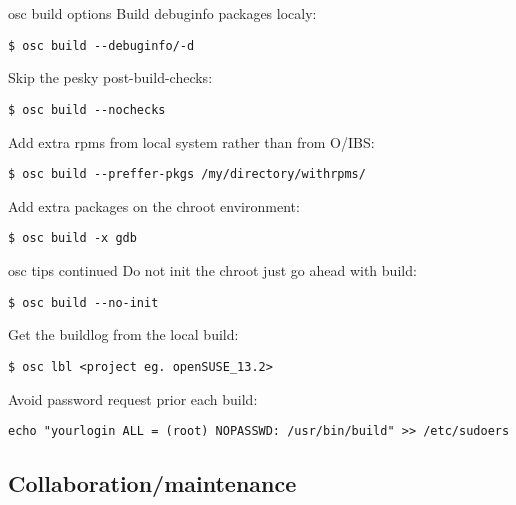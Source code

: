 \documentclass{beamer}
\begin{document}
\begin{frame}[fragile]{osc build options}
Build debuginfo packages localy:
\begin{small}
\begin{verbatim}$ osc build --debuginfo/-d\end{verbatim}
\end{small}
Skip the pesky post-build-checks:
\begin{small}
\begin{verbatim}$ osc build --nochecks\end{verbatim}
\end{small}
Add extra rpms from local system rather than from O/IBS:
\begin{small}
\begin{verbatim}$ osc build --preffer-pkgs /my/directory/withrpms/\end{verbatim}
\end{small}
Add extra packages on the chroot environment:
\begin{small}
\begin{verbatim}$ osc build -x gdb\end{verbatim}
\end{small}
\end{frame}

\begin{frame}[fragile]{osc tips continued}
Do not init the chroot just go ahead with build:
\begin{small}
\begin{verbatim}$ osc build --no-init\end{verbatim}
\end{small}
Get the buildlog from the local build:
\begin{small}
\begin{verbatim}$ osc lbl <project eg. openSUSE_13.2>\end{verbatim}
\end{small}
Avoid password request prior each build:
\begin{tiny}
\begin{verbatim}echo "yourlogin ALL = (root) NOPASSWD: /usr/bin/build" >> /etc/sudoers\end{verbatim}
\end{tiny}
\end{frame}

\subsection{Collaboration/maintenance}
\end{document}
